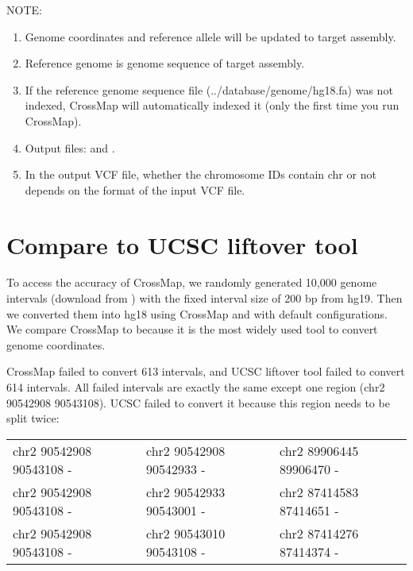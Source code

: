\documentclass[letterpaper,10pt,english]{sphinxmanual}
\begin{document}
NOTE:
\begin{enumerate}
\item {} 
Genome coordinates and reference allele will be updated to target assembly.

\item {} 
Reference genome is genome sequence of target assembly.

\item {} 
If the reference genome sequence file (../database/genome/hg18.fa) was not indexed, CrossMap will automatically indexed it (only the first time you run CrossMap).

\item {} 
Output files:  and .

\item {} 
In the output VCF file, whether the chromosome IDs contain \sphinxquotedblleft{}chr\sphinxquotedblright{} or not depends on the format of the input VCF file.

\end{enumerate}


\chapter{Compare to UCSC liftover tool}
\label{\detokenize{index:compare-to-ucsc-liftover-tool}}
To access the accuracy of CrossMap, we randomly generated 10,000 genome intervals (download from ) with the
fixed interval size of 200 bp from hg19. Then we converted them into hg18 using CrossMap
and  with default configurations. We compare CrossMap
to  because it is the most widely
used tool to convert genome coordinates.

CrossMap failed to convert 613 intervals, and UCSC liftover tool failed to convert 614
intervals. All failed intervals are exactly the same except one region (chr2 90542908 90543108).
UCSC failed to convert it because this region needs to be split twice:

\noindent\begin{tabulary}{\linewidth}{|L|L|L|}
\hline
{}\relax &\relax &\relax \\
\hline
chr2 90542908  90543108 -
&
chr2 90542908 90542933 -
&
chr2    89906445        89906470 -
\\
\hline
chr2 90542908  90543108 -
&
chr2 90542933 90543001 -
&
chr2    87414583        87414651 -
\\
\hline
chr2 90542908  90543108 -
&
chr2 90543010 90543108 -
&
chr2    87414276        87414374 -
\\
\hline\end{tabulary}
\end{document}
